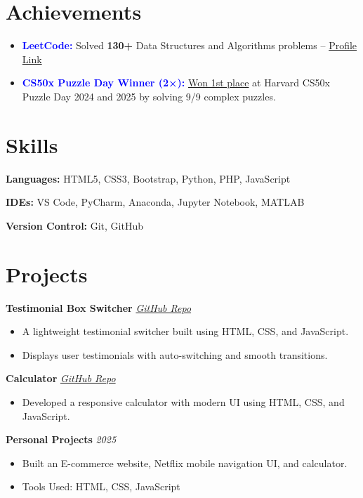 \documentclass[a4paper,11pt]{article}
\newcommand{\twocolentry}[2]{
    \noindent\textbf{#2} \hfill \textit{#1}
}
\newcommand{\onecolentry}[1]{
    \noindent #1 \par
}
\newenvironment{highlights}{
    \begin{itemize}[leftmargin=1.5em]
}{
    \end{itemize}
}
\newenvironment{cvitems}{
    \begin{itemize}[leftmargin=1.5em]
}{
    \end{itemize}
}
\begin{document}
\section*{Achievements}

\begin{cvitems}
    \item \textbf{\textcolor{blue}{LeetCode:}} Solved \textbf{130+} Data Structures and Algorithms problems – \href{https://leetcode.com/u/amina_liaquat04/}{Profile Link}
    
    \item \textbf{\textcolor{blue}{CS50x Puzzle Day Winner (2×):}} 
    \href{https://ik.imagekit.io/fjchcwc5f/WhatsApp%20Image%202025-07-06%20at%2010.53.51%20AM.jpeg?updatedAt=1751781535212}{Won 1st place} at Harvard CS50x Puzzle Day 2024 and 2025 by solving 9/9 complex puzzles.
\end{cvitems}

\section*{Skills}

\onecolentry{\textbf{Languages:} HTML5, CSS3, Bootstrap, Python, PHP, JavaScript}
\vspace{0.2cm}

\onecolentry{\textbf{IDEs:} VS Code, PyCharm, Anaconda, Jupyter Notebook, MATLAB}
\vspace{0.2cm}

\onecolentry{\textbf{Version Control:} Git, GitHub}

\section*{Projects}

\twocolentry{\href{https://github.com/amina-liaquat56/Testimonial-box-switcher.git}{GitHub Repo}}{Testimonial Box Switcher}
\begin{highlights}
    \item A lightweight testimonial switcher built using HTML, CSS, and JavaScript.
    \item Displays user testimonials with auto-switching and smooth transitions.
\end{highlights}

\twocolentry{\href{https://github.com/amina-liaquat56/Calculator.git}{GitHub Repo}}{Calculator}
\begin{highlights}
    \item Developed a responsive calculator with modern UI using HTML, CSS, and JavaScript.
\end{highlights}

\twocolentry{2025}{Personal Projects}
\begin{highlights}
    \item Built an E-commerce website, Netflix mobile navigation UI, and calculator.
    \item Tools Used: HTML, CSS, JavaScript
\end{highlights}
\end{document}
